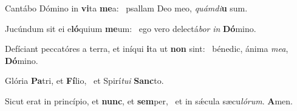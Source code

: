 \item Cantábo Dómino in \textbf{vi}ta \textbf{me}a:~\psstar{} psallam Deo meo, \textit{quámdi}\textbf{u} sum.
\item Jucúndum sit ei e\textbf{ló}quium \textbf{me}um:~\psstar{} ego vero delectá\textit{bor} \textit{in} \textbf{Dó}mino.
\item Defíciant peccatóres a terra, et iníqui \textbf{i}ta ut \textbf{non} sint:~\psstar{} bénedic, ánima \textit{mea}, \textbf{Dó}mino.
\item Glória \textbf{Pa}tri, et \textbf{Fí}lio,~\psstar{} et Spirí\textit{tui} \textbf{Sanc}to.
\item Sicut erat in princípio, et \textbf{nunc}, et \textbf{sem}per,~\psstar{} et in sǽcula sæcu\textit{lórum}. \textbf{A}men.